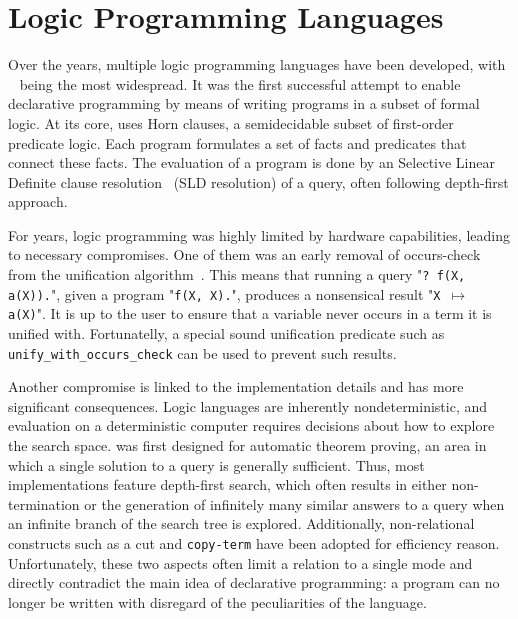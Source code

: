 \documentclass[crop=false]{standalone}
\begin{document}
\section{Logic Programming Languages}

Over the years, multiple logic programming languages have been developed, with \prolog~\cite{battani1973interpreteur} being the most widespread. 
It was the first successful attempt to enable declarative programming by means of writing programs in a subset of formal logic.
At its core, \prolog uses Horn clauses, a semidecidable subset of first-order predicate logic. 
Each program formulates a set of facts and predicates that connect these facts. 
The evaluation of a program is done by an Selective Linear Definite clause resolution~\cite{robinson1965machine} (SLD resolution) of a query, often following depth-first approach.  

For years, logic programming was highly limited by hardware capabilities, leading to necessary compromises. 
One of them was an early removal of occurs-check from the unification algorithm~\cite{cohen1988view}. 
This means that running a query "\texttt{? f(X, a(X)).}", given a program "\texttt{f(X, X).}", produces a nonsensical result "\texttt{X $\mapsto$ a(X)}". 
It is up to the user to ensure that a variable never occurs in a term it is unified with. 
Fortunatelly, a special sound unification predicate such as \texttt{unify\_with\_occurs\_check} can be used to prevent such results. 

Another compromise is linked to the implementation details and has more significant consequences. 
Logic languages are inherently nondeterministic, and evaluation on a deterministic computer requires decisions about how to explore the search space. 
\prolog was first designed for automatic theorem proving, an area in which a single solution to a query is generally sufficient. 
Thus, most \prolog implementations feature depth-first search, which often results in either non-termination or the generation of infinitely many similar answers to a query when an infinite branch of the search tree is explored. 
Additionally, non-relational constructs such as a cut and \texttt{copy-term} have been adopted for efficiency reason. 
Unfortunately, these two aspects often limit a relation to a single mode and directly contradict the main idea of declarative programming: a program can no longer be written with disregard of the peculiarities of the language. 
\end{document}
